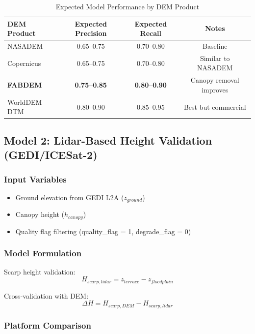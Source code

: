 \documentclass[11pt,letterpaper]{article}
\begin{document}
\begin{table}[h]
\centering
\caption{Expected Model Performance by DEM Product}
\label{tab:dem_model_performance}
\begin{tabular}{lccc}
\toprule
\textbf{DEM Product} & \textbf{Expected Precision} & \textbf{Expected Recall} & \textbf{Notes} \\
\midrule
NASADEM & 0.65--0.75 & 0.70--0.80 & Baseline \\
Copernicus & 0.65--0.75 & 0.70--0.80 & Similar to NASADEM \\
\textbf{FABDEM} & \textbf{0.75--0.85} & \textbf{0.80--0.90} & Canopy removal improves \\
WorldDEM DTM & 0.80--0.90 & 0.85--0.95 & Best but commercial \\
\bottomrule
\end{tabular}
\end{table}

\subsection{Model 2: Lidar-Based Height Validation (GEDI/ICESat-2)}

\subsubsection{Input Variables}
\begin{itemize}[noitemsep]
    \item Ground elevation from GEDI L2A ($z_{ground}$)
    \item Canopy height ($h_{canopy}$)
    \item Quality flag filtering (quality\_flag = 1, degrade\_flag = 0)
\end{itemize}

\subsubsection{Model Formulation}

Scarp height validation:
\begin{equation}
H_{scarp,lidar} = z_{terrace} - z_{floodplain}
\end{equation}

Cross-validation with DEM:
\begin{equation}
\Delta H = H_{scarp,DEM} - H_{scarp,lidar}
\end{equation}

\subsubsection{Platform Comparison}
\end{document}
